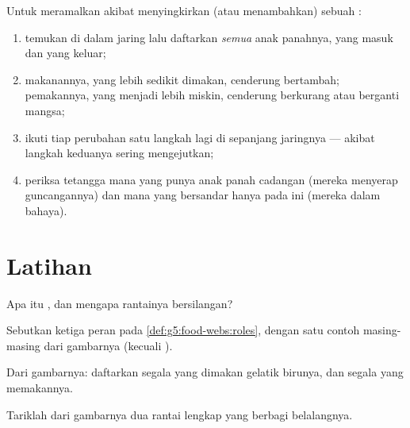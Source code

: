 \begin{method}\label{met:g5:food-webs:predict}
Untuk meramalkan akibat menyingkirkan (atau menambahkan) sebuah
:
\begin{enumerate}
  \item temukan  di dalam jaring lalu daftarkan \emph{semua}
        anak panahnya, yang masuk dan yang keluar;
  \item makanannya, yang lebih sedikit dimakan, cenderung bertambah;
        pemakannya, yang menjadi lebih miskin, cenderung berkurang
        atau berganti mangsa;
  \item ikuti tiap perubahan satu langkah lagi di sepanjang jaringnya
        --- akibat langkah keduanya sering mengejutkan;
  \item periksa tetangga mana yang punya anak panah cadangan (mereka
        menyerap guncangannya) dan mana yang bersandar hanya pada
         ini (mereka dalam bahaya).
\end{enumerate}
\end{method}

\section{Latihan}

\begin{exercise}[$\star$]\label{exo:g5:food-webs:1}
Apa itu , dan mengapa rantainya bersilangan?
\end{exercise}

\begin{exercise}[$\star$]\label{exo:g5:food-webs:2}
Sebutkan ketiga peran pada \cref{def:g5:food-webs:roles}, dengan satu
contoh masing-masing dari gambarnya (kecuali ).
\end{exercise}

\begin{exercise}[$\star$]\label{exo:g5:food-webs:3}
Dari gambarnya: daftarkan segala yang dimakan gelatik birunya, dan
segala yang memakannya.
\end{exercise}

\begin{exercise}[$\star$]\label{exo:g5:food-webs:4}
Tariklah dari gambarnya dua rantai lengkap yang berbagi belalangnya.
\end{exercise}

